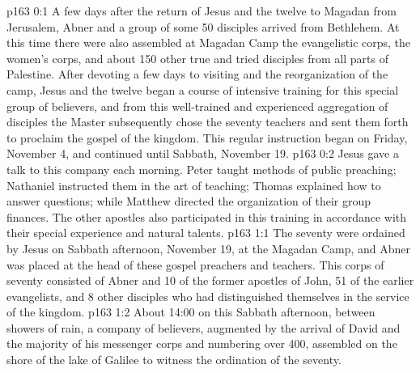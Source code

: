 \author{Midwayer Commission}
\vs p163 0:1 A few days after the return of Jesus and the twelve to Magadan from Jerusalem, Abner and a group of some 50 disciples arrived from Bethlehem. At this time there were also assembled at Magadan Camp the evangelistic corps, the women’s corps, and about 150 other true and tried disciples from all parts of Palestine. After devoting a few days to visiting and the reorganization of the camp, Jesus and the twelve began a course of intensive training for this special group of believers, and from this well\hyp{}trained and experienced aggregation of disciples the Master subsequently chose the seventy teachers and sent them forth to proclaim the gospel of the kingdom. This regular instruction began on Friday, November 4, and continued until Sabbath, November 19.
\vs p163 0:2 Jesus gave a talk to this company each morning. Peter taught methods of public preaching; Nathaniel instructed them in the art of teaching; Thomas explained how to answer questions; while Matthew directed the organization of their group finances. The other apostles also participated in this training in accordance with their special experience and natural talents.
\vs p163 1:1 The seventy were ordained by Jesus on Sabbath afternoon, November 19, at the Magadan Camp, and Abner was placed at the head of these gospel preachers and teachers. This corps of seventy consisted of Abner and 10 of the former apostles of John, 51 of the earlier evangelists, and 8 other disciples who had distinguished themselves in the service of the kingdom.
\vs p163 1:2 About 14:00 on this Sabbath afternoon, between showers of rain, a company of believers, augmented by the arrival of David and the majority of his messenger corps and numbering over 400, assembled on the shore of the lake of Galilee to witness the ordination of the seventy.
